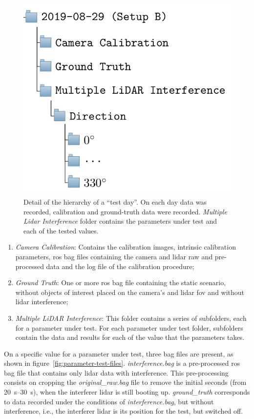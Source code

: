 \begin{figure}[H]
	\centering
	\includegraphics[scale=0.3]{img/datasets/test-subfolders.png}
	\caption{Detail of the hierarchy of a ``test day''. On each day data was recorded, calibration and ground-truth data were recorded. \textit{Multiple Lidar Interference} folder contains the parameters under test and each of the tested values.}
	\label{fig:test-subfolders}
\end{figure}


\begin{enumerate}
	\item \textit{Camera Calibration}: Contains the calibration images, intrinsic calibration parameters, \ac{ros} bag files containing the camera and \ac{lidar} raw and pre-processed data and the log file of the calibration procedure;
	\item \textit{Ground Truth}: One or more \ac{ros} bag file containing the static scenario, without objects of interest placed on the camera's and \ac{lidar} \ac{fov} and without \ac{lidar} interference;
	\item \textit{Multiple LiDAR Interference}: This folder contains a series of subfolders, each for a parameter under test. For each parameter under test folder, subfolders contain the data and results for each of the value that the parameters takes.
\end{enumerate}

On a specific value for a parameter under test, three bag files are present, as shown in figure~\ref{fig:parameter-test-files}. \textit{interference.bag} is a pre-processed \ac{ros} bag file that contains only \ac{lidar} data with interference. This pre-processing consists on cropping the \textit{original\_raw.bag} file to remove the initial seconds (from \SIrange{20}{30}{\second}), when the interferer \ac{lidar} is still booting up. \textit{ground\_truth} corresponds to data recorded under the conditions of \textit{interference.bag}, but without interference, i.e., the interferer \ac{lidar} is its position for the test, but switched off.


